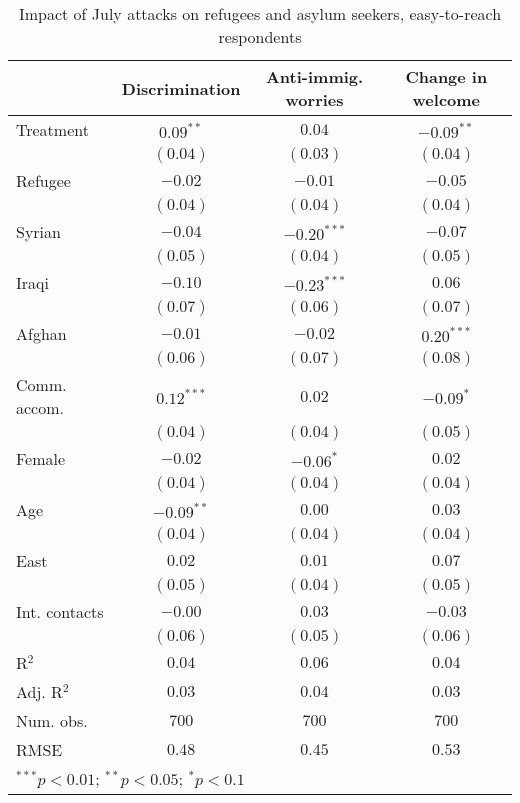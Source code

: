
\begin{table}
\caption{Impact of July attacks on refugees and asylum seekers, easy-to-reach respondents}
\begin{center}
\begin{tabular}{l c c c}
\toprule
 & Discrimination & Anti-immig. worries & Change in welcome \\
\midrule
Treatment     & $0.09^{**}$  & $0.04$        & $-0.09^{**}$ \\
              & $(0.04)$     & $(0.03)$      & $(0.04)$     \\
Refugee       & $-0.02$      & $-0.01$       & $-0.05$      \\
              & $(0.04)$     & $(0.04)$      & $(0.04)$     \\
Syrian        & $-0.04$      & $-0.20^{***}$ & $-0.07$      \\
              & $(0.05)$     & $(0.04)$      & $(0.05)$     \\
Iraqi         & $-0.10$      & $-0.23^{***}$ & $0.06$       \\
              & $(0.07)$     & $(0.06)$      & $(0.07)$     \\
Afghan        & $-0.01$      & $-0.02$       & $0.20^{***}$ \\
              & $(0.06)$     & $(0.07)$      & $(0.08)$     \\
Comm. accom.  & $0.12^{***}$ & $0.02$        & $-0.09^{*}$  \\
              & $(0.04)$     & $(0.04)$      & $(0.05)$     \\
Female        & $-0.02$      & $-0.06^{*}$   & $0.02$       \\
              & $(0.04)$     & $(0.04)$      & $(0.04)$     \\
Age           & $-0.09^{**}$ & $0.00$        & $0.03$       \\
              & $(0.04)$     & $(0.04)$      & $(0.04)$     \\
East          & $0.02$       & $0.01$        & $0.07$       \\
              & $(0.05)$     & $(0.04)$      & $(0.05)$     \\
Int. contacts & $-0.00$      & $0.03$        & $-0.03$      \\
              & $(0.06)$     & $(0.05)$      & $(0.06)$     \\
\midrule
R$^2$         & $0.04$       & $0.06$        & $0.04$       \\
Adj. R$^2$    & $0.03$       & $0.04$        & $0.03$       \\
Num. obs.     & $700$        & $700$         & $700$        \\
RMSE          & $0.48$       & $0.45$        & $0.53$       \\
\bottomrule
\multicolumn{4}{l}{\scriptsize{$^{***}p<0.01$; $^{**}p<0.05$; $^{*}p<0.1$}}
\end{tabular}
\label{tab_host_reach}
\end{center}
\end{table}
